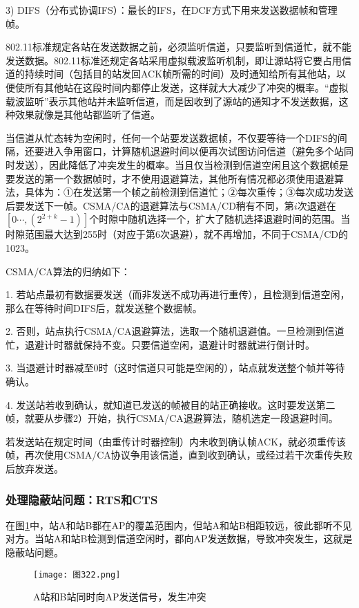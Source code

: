 \documentclass{ctexbook}
\begin{document}
	3) DIFS（分布式协调IFS）：最长的IFS，在DCF方式下用来发送数据帧和管理帧。
	
	802.11标准规定各站在发送数据之前，必须监听信道，只要监听到信道忙，就不能发送数据。802.11标准还规定各站采用虚拟载波监听机制，即让源站将它要占用信道的持续时间（包括目的站发回ACK帧所需的时间）及时通知给所有其他站，以便使所有其他站在这段时间内都停止发送，这样就大大减少了冲突的概率。“虚拟载波监听”表示其他站并未监听信道，而是因收到了源站的通知才不发送数据，这种效果就像是其他站都监听了信道。
	
	当信道从忙态转为空闲时，任何一个站要发送数据帧，不仅要等待一个DIFS的间隔，还要进入争用窗口，计算随机退避时间以便再次试图访问信道（避免多个站同时发送），因此降低了冲突发生的概率。当且仅当检测到信道空闲且这个数据帧是要发送的第一个数据帧时，才不使用退避算法，其他所有情况都必须使用退避算法，具体为：①在发送第一个帧之前检测到信道忙；②每次重传；③每次成功发送后要发送下一帧。CSMA/CA的退避算法与CSMA/CD稍有不同，第$i$次退避在$[0 \cdots, (2^{2 + k} - 1)]$个时隙中随机选择一个，扩大了随机选择退避时间的范围。当时隙范围最大达到255时（对应于第6次退避），就不再增加，不同于CSMA/CD的1023。
	
	CSMA/CA算法的归纳如下：
	
	1. 若站点最初有数据要发送（而非发送不成功再进行重传），且检测到信道空闲，那么在等待时间DIFS后，就发送整个数据帧。
	
	2. 否则，站点执行CSMA/CA退避算法，选取一个随机退避值。一旦检测到信道忙，退避计时器就保持不变。只要信道空闲，退避计时器就进行倒计时。
	
	3. 当退避计时器减至0时（这时信道只可能是空闲的），站点就发送整个帧并等待确认。
	
	4. 发送站若收到确认，就知道已发送的帧被目的站正确接收。这时要发送第二帧，就要从步骤2）开始，执行CSMA/CA退避算法，随机选定一段退避时间。
	
	若发送站在规定时间（由重传计时器控制）内未收到确认帧ACK，就必须重传该帧，再次使用CSMA/CA协议争用该信道，直到收到确认，或经过若干次重传失败后放弃发送。
	
	\subsubsection*{处理隐蔽站问题：RTS和CTS}
	在图\ref{fig:hidden_station_problem}中，站A和站B都在AP的覆盖范围内，但站A和站B相距较远，彼此都听不见对方。当站A和站B检测到信道空闲时，都向AP发送数据，导致冲突发生，这就是隐蔽站问题。
	
	\begin{figure}[h]
		\centering
		\caption{A站和B站同时向AP发送信号，发生冲突}
		\label{fig:hidden_station_problem}
		\texttt{[image: 图322.png]} %
	\end{figure}
	
\end{document}
